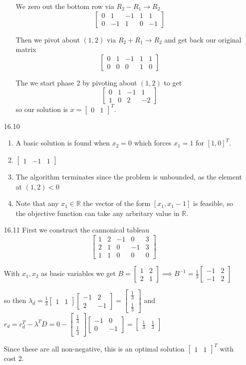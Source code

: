 \documentclass[10pt,a4paper]{article}
\newcommand\m[1]{\begin{bmatrix}#1\end{bmatrix}}
\begin{document}
\begin{enumerate}
\begin{enumerate}
        We zero out the bottom row via $ R_2 - R_1 \rightarrow R_2$
        $$\m{ 0 & 1 & -1 & 1 & 1 \\ 0 & -1 & 1 & 0 & -1 }$$

        Then we pivot about $(1, 2)$ via $R_2 + R_1 \rightarrow R_2$ and get back our original matrix
        $$\m{ 0 & 1 & -1 & 1 & 1 \\ 0 & 0 & 0 & 1 & 0 }$$

        The we start phase 2 by pivoting about $(1, 2)$ to get
        $$\m{ 0 & 1 & -1 &  1 \\ 1 & 0 & 2 & -2  }$$
        so our solution is $ x = \m{0 & 1}^T$.

    \end{enumerate}
        
    \item [16.10]
    \begin{enumerate}
        \item A basic solution is found when $x_2 = 0$ which forces $x_1= 1$ for $[1, 0 ]^T$.
        \item $\m{1 & -1 & 1}$
        \item The algorithm terminates since the problem is unbounded, as the element at $(1, 2) < 0$ 
        \item Note that any $x_1 \in \mathbb{R}$  the vector of the form $[x_1, x_1 -1]$ is feasible, so the objective function can take any arbritary value in $\mathbb{R}$.
    \end{enumerate}

    \item [16.11]
    First we construct the cannonical tableau $$\m{1 & 2 & -1 & 0 & 3 \\ 2 & 1 & 0 & -1  & 3 \\ 1 & 1 & 0 & 0 &0 }$$

    With $x_1, x_2$ as basic variables we get $ B = \m{1 & 2 \\ 2 & 1} \implies B^{-1} = \frac{1}{3}\m{-1 & 2 \\ -1 & 2}$

    so then $\lambda_d = \frac{1}{3}\m{1 & 1} \m{-1 & 2 \\ 2 & -1} = \m{\frac{1}{3} \\ \frac{1}{3}}$ and $r_d = c^T_d - \lambda^T D = 0 - \m{\frac{1}{3} \\ \frac{1}{3}} \m{-1 & 0 \\ 0 & -1 } = \m{\frac{1}{3} & \frac{1}{3}}$

    Since these are all non-negative, this is an optimal solution $\m{1 & 1}^T$ with cost 2.


\end{enumerate}
\end{document}

